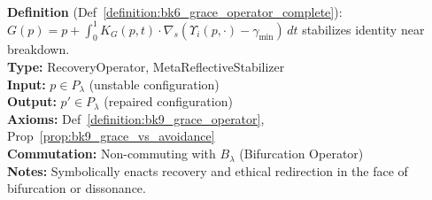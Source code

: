 \begin{description}[leftmargin=2.5cm, style=nextline]
\item[\textbf{Grace Operator} \hfill \ensuremath{G}] \leavevmode\\
\textbf{Definition} (Def~\ref{definition:bk6_grace_operator_complete}): \( G(p) = p + \int_0^1 K_G(p, t) \cdot \nabla_s (\Upsilon_i(p, \cdot) - \gamma_{\min}) \, dt \) stabilizes identity near breakdown.\\
\textbf{Type:} RecoveryOperator, MetaReflectiveStabilizer\\
\textbf{Input:} \( p \in P_\lambda \) (unstable configuration)\\
\textbf{Output:} \( p' \in P_\lambda \) (repaired configuration)\\
\textbf{Axioms:} Def~\ref{definition:bk9_grace_operator}, Prop~\ref{prop:bk9_grace_vs_avoidance}\\
\textbf{Commutation:} Non-commuting with \( B_\lambda \) (Bifurcation Operator)\\
\textbf{Notes:} Symbolically enacts recovery and ethical redirection in the face of bifurcation or dissonance.

\end{description}
